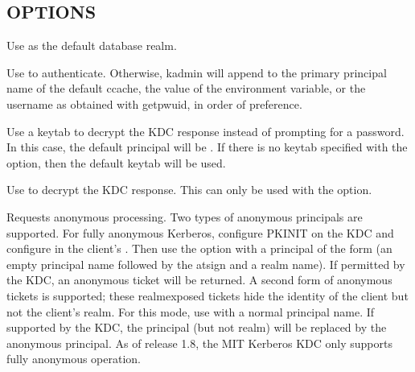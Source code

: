 \documentclass[letterpaper,10pt,english]{sphinxmanual}
\begin{document}
\subsection{OPTIONS}
\label{\detokenize{admin/admin_commands/kadmin_local:options}}\label{\detokenize{admin/admin_commands/kadmin_local:kadmin-options}}\begin{description}
\sphinxAtStartPar
Use  as the default database realm.

\sphinxAtStartPar
Use  to authenticate.  Otherwise, kadmin will append
 to the primary principal name of the default ccache,
the value of the  environment variable, or the username as
obtained with getpwuid, in order of preference.

\sphinxAtStartPar
Use a keytab to decrypt the KDC response instead of prompting for
a password.  In this case, the default principal will be
.  If there is no keytab specified with the
 option, then the default keytab will be used.

\sphinxAtStartPar
Use  to decrypt the KDC response.  This can only be used
with the  option.

\sphinxAtStartPar
Requests anonymous processing.  Two types of anonymous principals
are supported.  For fully anonymous Kerberos, configure PKINIT on
the KDC and configure  in the client’s
{\hyperref[\detokenize{admin/conf_files/krb5_conf:krb5-conf-5}]{}}.  Then use the  option with a principal
of the form  (an empty principal name followed by the
at\sphinxhyphen{}sign and a realm name).  If permitted by the KDC, an anonymous
ticket will be returned.  A second form of anonymous tickets is
supported; these realm\sphinxhyphen{}exposed tickets hide the identity of the
client but not the client’s realm.  For this mode, use  with a normal principal name.  If supported by the KDC, the
principal (but not realm) will be replaced by the anonymous
principal.  As of release 1.8, the MIT Kerberos KDC only supports
fully anonymous operation.


\end{description}
\end{document}
